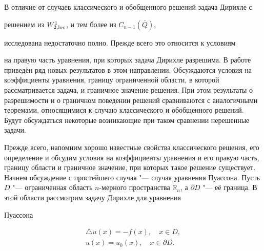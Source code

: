 В отличие от случаев классического и обобщенного решений задача Дирихле с

решением из $W^1_{2, {\rm loc}}$, и тем более из $C_{n-1}(\bar{Q})$,

исследована недостаточно полно. Прежде всего это относится к условиям

на правую часть уравнения, при которых задача Дирихле разрешима. В работе приведён ряд новых результатов в этом направлении. Обсуждаются условия на коэффициенты уравнения, границу ограниченной области, в которой рассматривается задача, и граничное значение решения. При этом результаты о разрешимости и о граничном поведении решений сравниваются с аналогичными теоремами, относящимися к случаю классического и обобщенного решений. Будут обсуждаться некоторые возникающие при таком сравнении нерешенные задачи.



\smallskip




Прежде всего, напомним хорошо известные свойства классического решения, его определение и обсудим условия на коэффициенты уравнения и его правую часть, границу области и граничное значение, при которых такое решение существует. Начнем обсуждение с простейшего случая "--- случая уравнения Пуассона. Пусть $D$ "--- ограниченная область $n$-мерного пространства ${\mathbb{R}}_n$, а $\partial D$ "--- её граница. В этой области рассмотрим задачу Дирихле для уравнения

Пуассона

\begin{gather}

\label{gushin:eq1}

\bigtriangleup u(x) =  -f(x), \quad x \in D, \\

\label{gushin:eq2}

u(x) = u_0(x), \quad x \in \partial D.

\end{gather}



